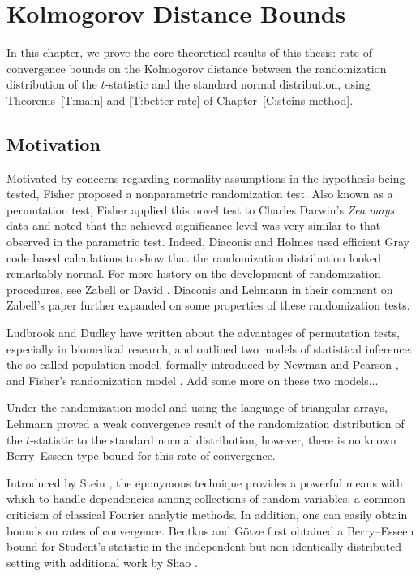 \chapter{Kolmogorov Distance Bounds}
\label{C:stein-proof} In this chapter, we prove the core theoretical
results of this thesis: rate of convergence bounds on the Kolmogorov
distance between the randomization distribution of the $t$-statistic
and the standard normal distribution, using
Theorems~\ref{T:main} and \ref{T:better-rate} of Chapter~\ref{C:steins-method}.

\section{Motivation}
Motivated by concerns regarding normality
assumptions in the hypothesis being tested, Fisher
\cite{fisher1935design} proposed a nonparametric randomization test.
Also known as a permutation test, Fisher applied this novel test to
Charles Darwin's \emph{Zea mays} data and noted that the achieved
significance level was very similar to that observed in the parametric
test.  Indeed, Diaconis and Holmes \cite{diaconis1994gray} used
efficient Gray code based calculations to show that the randomization
distribution looked remarkably normal.  For more history on the
development of randomization procedures, see Zabell
\cite{zabell2008student} or David \cite{david2008beginnings}.
Diaconis and Lehmann \cite{diaconis2008comment} in their comment on
Zabell's paper further expanded on some properties of these
randomization tests.

Ludbrook and Dudley \cite{ludbrook1998permutation} have written about
the advantages of permutation tests, especially in biomedical
research, and outlined two models of statistical inference: the
so-called population model, formally introduced by Newman and Pearson
\cite{neyman1928use}, and Fisher's randomization model
\cite{fisher1935design}.  Add some more on these two models...

Under the randomization model and using the language of triangular
arrays, Lehmann \cite{lehmann1999elements} proved a weak convergence
result of the randomization distribution of the $t$-statistic to the
standard normal distribution, however, there is no known
Berry--Esseen-type bound for this rate of convergence.

Introduced by Stein \cite{stein1986approximate}, the eponymous
technique provides a powerful means with which to handle dependencies
among collections of random variables, a common criticism of classical
Fourier analytic methods.  In addition, one can easily obtain bounds
on rates of convergence.  Bentkus and G{\"o}tze
\cite{bentkus1996berry} first obtained a Berry--Esseen bound for
Student's statistic in the independent but non-identically distributed
setting with additional work by Shao \cite{shao2005explicit}.

